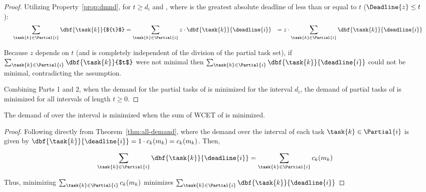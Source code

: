 \begin{theorem}
\begin{proof}
  Utilizing Property~\ref{prop:dmnd}, for ${t \ge d_i}$ and
  , where  is the greatest absolute deadline
  of  less than or equal to ${t}$ (${\Deadline{z} \le t}$): %
  \begin{equation*}
    \indent
    \begin{split}
    \sum_{\task{k} \in \Partial{i}} \dbf{\task{k}}{${t}$} &=
      \sum_{\task{k} \in \Partial{i}} z \cdot
      \dbf{\task{k}}{\deadline{i}} 
      & = z \cdot \sum_{\task{k} \in \Partial{i}} \dbf{\task{k}}{\deadline{i}}
    \end{split}
  \end{equation*}

  Because ${z}$ depends on ${t}$ (and is completely independent of the
  division of the partial task set), if ${\sum_{\task{k} \in \Partial{i}}
    \dbf{\task{k}}{$t$}}$ were not minimal then
  ${\sum_{\task{k} \in \Partial{i}} \dbf{\task{k}}{\deadline{i}}}$ could not
  be minimal, contradicting the assumption.

  Combining Parts 1 and 2, when the demand for the partial tasks of
   is minimized for the interval ${d_i}$, the demand of
  partial tasks of  is minimized for all intervals of length 
  ${t \ge 0}$.    
\end{proof}
\end{theorem}

\begin{corollary}
  \label{corollary:min-demand-di}
  The demand of  over the interval  is
  minimized when the sum of WCET of  is minimized.
\begin{proof} Following directly from
  Theorem~\ref{thm:all-demand}, where the demand over the interval
   of each task ${\task{k} \in \Partial{i}}$ is given by
  ${\dbf{\task{k}}{\deadline{i}} = 1 \cdot c_k(m_k) =
    c_k(m_k)}$. Then,

  \begin{equation*}
    \indent
    \begin{split}
      \sum_{\task{k} \in \Partial{i}} \dbf{\task{k}}{\deadline{i}} &=
        \sum_{\task{k} \in \Partial{i}} c_k(m_k)
    \end{split}
  \end{equation*}

  Thus, minimizing ${\sum_{\task{k} \in \Partial{i}} c_k(m_k)}$
  minimizes ${\sum_{\task{k} \in \Partial{i}}
  \dbf{\task{k}}{\deadline{i}}}$
\end{proof}

\end{corollary}

